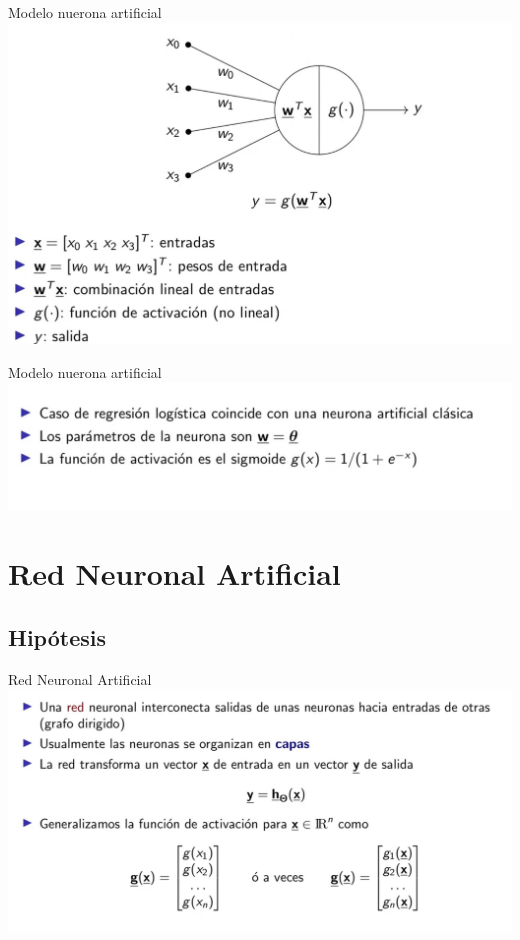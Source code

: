 \documentclass[8pt]{beamer}  %
\begin{document}
\begin{frame}{Modelo nuerona artificial}
	\includegraphics[width=\textwidth]{im7}
\end{frame}
\begin{frame}{Modelo nuerona artificial}
	\includegraphics[width=\textwidth]{im8}
\end{frame}
\section{Red Neuronal Artificial}
\subsection{Hipótesis}
\begin{frame}{Red Neuronal Artificial}
\includegraphics[width=\textwidth]{im9}
\end{frame}
\end{document}
